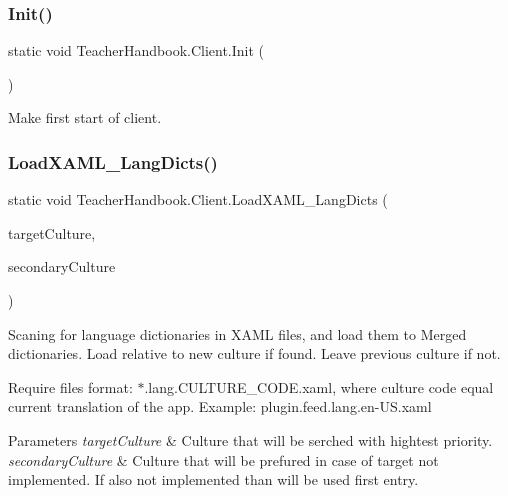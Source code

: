 \subsubsection{\texorpdfstring{Init()}{Init()}}
{\footnotesize\ttfamily static void Teacher\+Handbook.\+Client.\+Init (\begin{DoxyParamCaption}{ }\end{DoxyParamCaption})\hspace{0.3cm}{\ttfamily [static]}}



Make first start of client. 

\mbox{\label{class_teacher_handbook_1_1_client_a863d00fe6a0ac5b86583c0a8245e07e9}} 
\subsubsection{\texorpdfstring{Load\+X\+A\+M\+L\+\_\+\+Lang\+Dicts()}{LoadXAML\_LangDicts()}}
{\footnotesize\ttfamily static void Teacher\+Handbook.\+Client.\+Load\+X\+A\+M\+L\+\_\+\+Lang\+Dicts (\begin{DoxyParamCaption}\item[{Culture\+Info}]{target\+Culture,  }\item[{Culture\+Info}]{secondary\+Culture }\end{DoxyParamCaption})\hspace{0.3cm}{\ttfamily [static]}}



Scaning for language dictionaries in X\+A\+ML files, and load them to Merged dictionaries. Load relative to new culture if found. Leave previous culture if not. 

Require files format\+: $\ast$.lang.\+C\+U\+L\+T\+U\+R\+E\+\_\+\+C\+O\+D\+E.\+xaml, where culture code equal current translation of the app. Example\+: plugin.\+feed.\+lang.\+en-\/\+U\+S.\+xaml 


\begin{DoxyParams}{Parameters}
{\em target\+Culture} & Culture that will be serched with hightest priority.\\
\hline
{\em secondary\+Culture} & Culture that will be prefured in case of target not implemented. If also not implemented than will be used first entry.\\
\hline
\end{DoxyParams}



